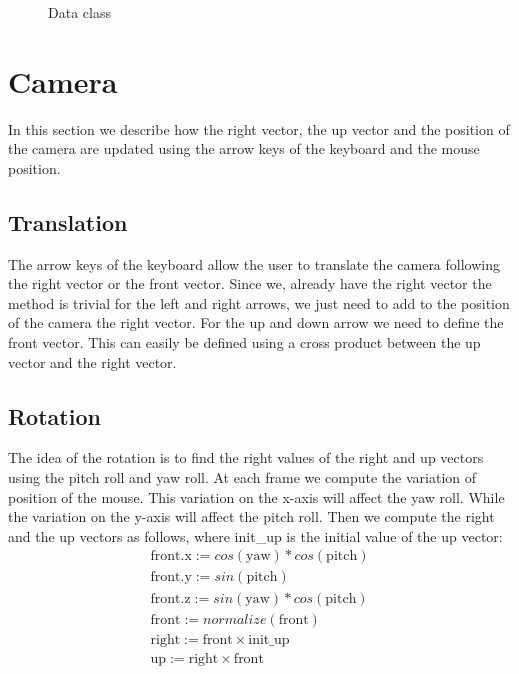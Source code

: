 \documentclass[a4paper,12pt,journal,twoside,compsoc]{PPIEEEtran}
\begin{document}
\begin{figure}
\centering
{}
\caption{Data class}
\label{Fig:umldata}
\end{figure}

\section{Camera}
In this section we describe how the right vector, the up vector and the
position of the camera are updated using the arrow keys of the keyboard and the
mouse position.

\subsection{Translation}

The arrow keys of the keyboard allow the user to translate the camera following
the right vector or the front vector. Since we, already have the right vector
the method is trivial for the left and right arrows, we just need to add to the
position of the camera the right vector. For the up and down arrow we need to
define the front vector. This can easily be defined using a cross product between
the up vector and the right vector.

\subsection{Rotation}

The idea of the rotation is to find the right values of the right and up vectors
using the pitch roll and yaw roll. At each frame we compute the variation
of position of the mouse. This variation on the x-axis will affect the yaw
roll. While the variation on the y-axis will affect the pitch roll. Then
we compute the right and the up vectors as follows, where init\_up is the
initial value of the up vector:
\begin{align*}
  \text{front.x} := cos(\text{yaw}) * cos(\text{pitch}) \\
  \text{front.y} := sin(\text{pitch}) \\
  \text{front.z} := sin(\text{yaw}) * cos(\text{pitch}) \\
  \text{front} := normalize(\text{front}) \\
  \text{right} := \text{front} \times \text{init\_up} \\
  \text{up} := \text{right} \times \text{front} \\
\end{align*}
\end{document}
